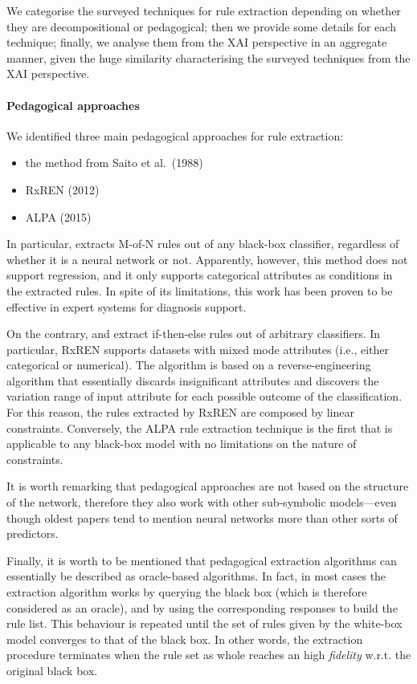 \documentclass[12pt,a4paper,openright,twoside]{book}
\begin{document}
We categorise the surveyed techniques for rule extraction depending on whether they are decompositional or pedagogical;
then we provide some details for each technique;
finally, we analyse them from the XAI perspective in an aggregate manner, given the huge similarity characterising the surveyed techniques from the XAI perspective.

\paragraph{Pedagogical approaches}

We identified three main pedagogical approaches for rule extraction:
\begin{itemize}
	\item the method from Saito et al.\ (1988) \cite{saito1988}
	\item RxREN (2012) \cite{AugastaK12}
	\item ALPA (2015) \cite{Fortuny2015}
\end{itemize}

In particular, \cite{saito1988} extracts M-of-N rules out of any black-box classifier, regardless of whether it is a neural network or not.
%
Apparently, however, this method does not support regression, and it only supports categorical attributes as conditions in the extracted rules.
%
In spite of its limitations, this work has been proven to be effective in expert systems for diagnosis support.

On the contrary, \cite{AugastaK12} and \cite{Fortuny2015} extract if-then-else rules out of arbitrary classifiers.
%
In particular, RxREN supports datasets with mixed mode attributes (i.e., either categorical or numerical).
%
The algorithm is based on a reverse-engineering algorithm that essentially discards insignificant attributes and discovers the variation range of input attribute for each possible outcome of the classification.
%
For this reason, the rules extracted by RxREN are composed by linear constraints.
%
Conversely, the ALPA rule extraction technique is the first that is applicable to any black-box model with no limitations on the nature of constraints.

It is worth remarking that pedagogical approaches are not based on the structure of the network, therefore they also work with other sub-symbolic models---even though oldest papers tend to mention neural networks more than other sorts of predictors.

Finally, it is worth to be mentioned that pedagogical extraction algorithms can essentially be described as oracle-based algorithms.
%
In fact, in most cases the extraction algorithm works by querying the black box (which is therefore considered as an oracle), and by using the corresponding responses to build the rule list.
%
This behaviour is repeated until the set of rules given by the white-box model converges to that of the black box.
%
In other words, the extraction procedure terminates when the rule set as whole reaches an high \emph{fidelity} w.r.t. the original black box.
\end{document}
